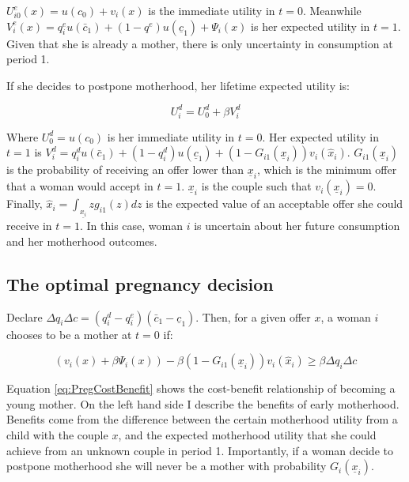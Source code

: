 \documentclass[a4paper,10pt,twocolumn,preprint,3p,authoryear]{elsarticle}
\begin{document}
$U_{i0}^{e}\left(x\right)=u\left(c_{0}\right)+ v_{i}\left(x\right)$ is the immediate utility in $t=0$. Meanwhile $V_{i}^{e}\left( x \right)=q_{i}^{e}u\left(\bar{c}_{1}\right)+\left(1-q^{e}\right)u\left(\underline{c}_{1}\right)+\Psi_{i}\left( x \right)$ is her expected utility in $t=1$. Given that she is already a mother, there is only uncertainty in consumption at period 1.    

If she decides to postpone motherhood, her lifetime expected utility is:

\begin{equation}
	U_{i}^{d}=U_{0}^{d}+\beta V_{i}^{d}
	\label{eq:ExpU_DelayMother}
\end{equation}

Where $U_{0}^{d}=u\left(c_{0}\right)$ is her immediate utility in $t=0$. Her expected utility in $t=1$ is $V_{i}^{d}= q_{i}^{d}u\left( \bar{c}_{1} \right) + \left(1-q_{i}^{d}\right)u\left(\underline{c}_{1}\right) + \left(1-G_{i1}\left( \underline{x}_{i} \right)\right)v_{i}\left(\hat{x}_{i}\right)$. $G_{i1}\left( \underline{x}_{i} \right)$ is the probability of receiving an offer lower than $\underline{x}_{i}$, which is the minimum offer that a woman would accept in $t=1$. $\underline{x}_{i}$ is the couple such that $ v_{i}\left( \underline{x}_{i} \right)=0$. Finally, $\hat{x}_{i}=\int_{\underline{x_{i}}}zg_{i1}\left(z\right)dz$ is the expected value of an acceptable offer she could receive in $t=1$. In this case, woman $i$ is uncertain about her future consumption and her motherhood outcomes.

\subsection{The optimal pregnancy decision}

Declare $\Delta q_{i}\Delta c=\left(q_{i}^{d}-q_{i}^{e}\right)\left(\bar{c}_{1}-\underline{c}_{1}\right)$. Then, for a given offer $x$, a woman $i$ chooses to be a mother at $t=0$ if:

	\begin{equation}
		\left(v_{i}\left(x\right) + \beta\Psi_{i}\left( x \right)\right)-\beta\left(1-G_{i1}\left( \underline{x}_{i} \right)\right)v_{i}\left(\hat{x}_{i}\right) \geq \beta\Delta q_{i}\Delta c
		\label{eq:PregCostBenefit}
	\end{equation}
	
Equation \ref{eq:PregCostBenefit} shows the cost-benefit relationship of becoming a young mother. On the left hand side I describe the benefits of early motherhood. Benefits come from the difference between the certain motherhood utility from a child with the couple $x$, and the expected motherhood utility that she could achieve from an unknown couple in period 1. Importantly, if a woman decide to postpone motherhood she will never be a mother with probability $G_{i}\left( \underline{x}_{i} \right)$.
\end{document}
